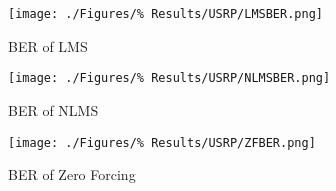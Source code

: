 \begin{figure}[ht]
	\centering
	\begin{minipage}{0.49\textwidth}
		\centering
		\texttt{[image: ./Figures/\%
		Results/USRP/LMSBER.png]}
		\captionsetup{width=0.75\linewidth}
		\caption{BER of LMS}
	\end{minipage}
	\begin{minipage}{0.49\textwidth}
		\centering
		\texttt{[image: ./Figures/\%
		Results/USRP/NLMSBER.png]}
		\captionsetup{width=0.75\linewidth}
		\caption{BER of NLMS}
		\label{fig:NLMS-BER-USRP}
	\end{minipage}
\end{figure}
\begin{figure}[ht]
	\centering
	\texttt{[image: ./Figures/\%
	Results/USRP/ZFBER.png]}
	\captionsetup{width=0.75\linewidth}
	\caption{BER of Zero Forcing}
\end{figure}
